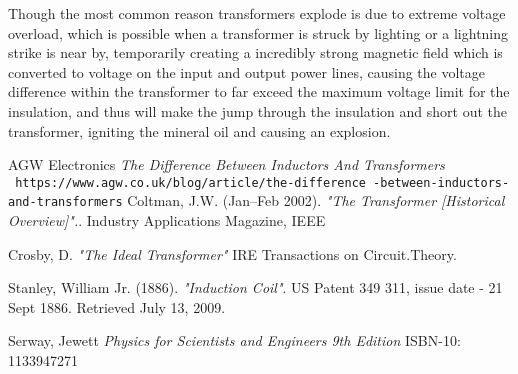 \documentclass[12pt]{article}
\begin{document}
Though the most common reason transformers explode is due to extreme voltage overload, which is possible when a transformer is struck by lighting or a lightning strike is near by, temporarily creating a incredibly strong magnetic field which is converted to voltage on the input and output power lines, causing the voltage difference within the transformer to far exceed the maximum voltage limit for the insulation, and thus will make the jump through the insulation and short out the transformer, igniting the mineral oil and causing an explosion. 

\begin{thebibliography}{9}
	AGW Electronics
	\textit{The Difference Between Inductors And Transformers} \\\texttt{
	https://www.agw.co.uk/blog/article/the-difference
	-between-inductors-and-transformers}
	Coltman, J.W. (Jan–Feb 2002).
	\textit{"The Transformer [Historical Overview]".}. 
	Industry Applications Magazine, IEEE
	
	Crosby, D. 
	\textit{ "The Ideal Transformer" }
	 IRE Transactions on Circuit.Theory. 

	
	Stanley, William Jr. (1886). \textit{"Induction Coil"}. US Patent 349 311, issue date - 21 Sept 1886. Retrieved July 13, 2009.


	Serway, Jewett  \textit{Physics for Scientists and Engineers 9th Edition}
	ISBN-10: 1133947271
	
\end{thebibliography}
\end{document}
